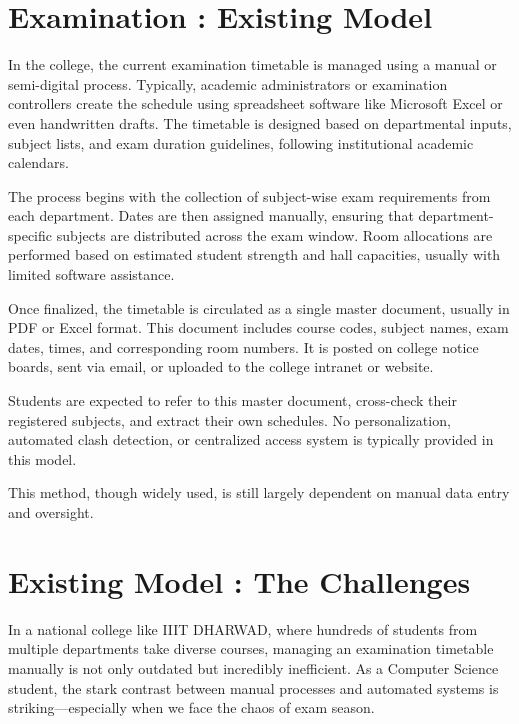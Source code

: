 \documentclass[a4paper,12pt]{article}
\begin{document}
\section{Examination : Existing Model}
In the college, the current examination timetable is managed using a manual or semi-digital process. Typically, academic administrators or examination controllers create the schedule using spreadsheet software like Microsoft Excel or even handwritten drafts. The timetable is designed based on departmental inputs, subject lists, and exam duration guidelines, following institutional academic calendars.\newline

The process begins with the collection of subject-wise exam requirements from each department. Dates are then assigned manually, ensuring that department-specific subjects are distributed across the exam window. Room allocations are performed based on estimated student strength and hall capacities, usually with limited software assistance.\newline

Once finalized, the timetable is circulated as a single master document, usually in PDF or Excel format. This document includes course codes, subject names, exam dates, times, and corresponding room numbers. It is posted on college notice boards, sent via email, or uploaded to the college intranet or website.\newline

Students are expected to refer to this master document, cross-check their registered subjects, and extract their own schedules. No personalization, automated clash detection, or centralized access system is typically provided in this model.\newline

This method, though widely used, is still largely dependent on manual data entry and oversight.








\newpage
\section{Existing Model : The Challenges}

In a national college like IIIT DHARWAD, where hundreds of students from multiple departments take diverse courses, managing an examination timetable manually is not only outdated but incredibly inefficient. As a Computer Science student, the stark contrast between manual processes and automated systems is striking—especially when we face the chaos of exam season.\newline
\end{document}
